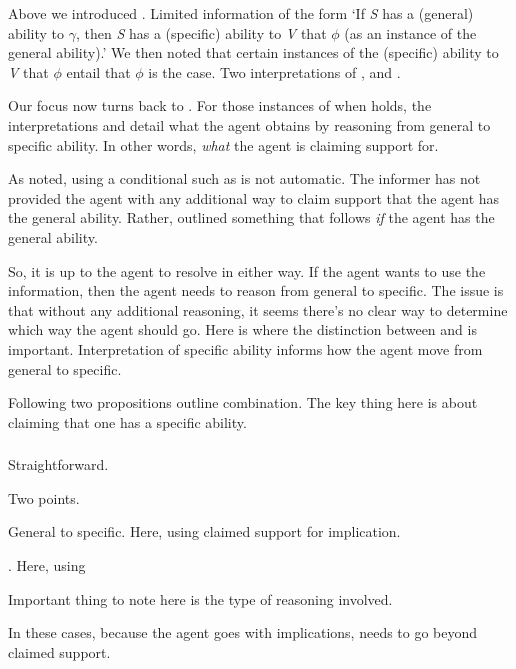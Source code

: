 \begin{note}[Summarising]
  Above we introduced \gsi{}.
  Limited information of the form `If \emph{S} has a (general) ability to \(\gamma\), then \emph{S} has a (specific) ability to \emph{V} that \(\phi\) (as an instance of the general ability).'
  We then noted that certain instances of the (specific) ability to \emph{V} that \(\phi\) entail that \(\phi\) is the case.
  Two interpretations of , \AR{} and \WR{}.

  Our focus now turns back to \gsi{}.
  For those instances of \gsi{} when  holds, the interpretations \AR{} and \WR{} detail what the agent obtains by reasoning from general to specific ability.
  In other words, \emph{what} the agent is claiming support for.

  As noted, using a conditional such as \gsi{} is not automatic.
  The informer has not provided the agent with any additional way to claim support that the agent has the general ability.
  Rather, outlined something that follows \emph{if} the agent has the general ability.

  So, it is up to the agent to resolve in either way.
  If the agent wants to use the information, then the agent needs to reason from general to specific.
  The issue is that without any additional reasoning, it seems there's no clear way to determine which way the agent should go.
  Here is where the distinction between \AR{} and \WR{} is important.
  Interpretation of specific ability informs how the agent move from general to specific.

  Following two propositions outline combination.
  {
    \color{red}
    The key thing here is about claiming that one has a specific ability.
  }
\end{note}

\subsubsection{\nr{}}
\label{sec:nr}

\begin{note}
  Straightforward.

  Two points.

  General to specific.
  Here, using claimed support for implication.

  .
  Here, using 
\end{note}

\begin{note}[\RBV{}]
  Important thing to note here is the type of reasoning involved.

  In these cases, because the agent goes with implications, needs to go beyond claimed support.
\end{note}

